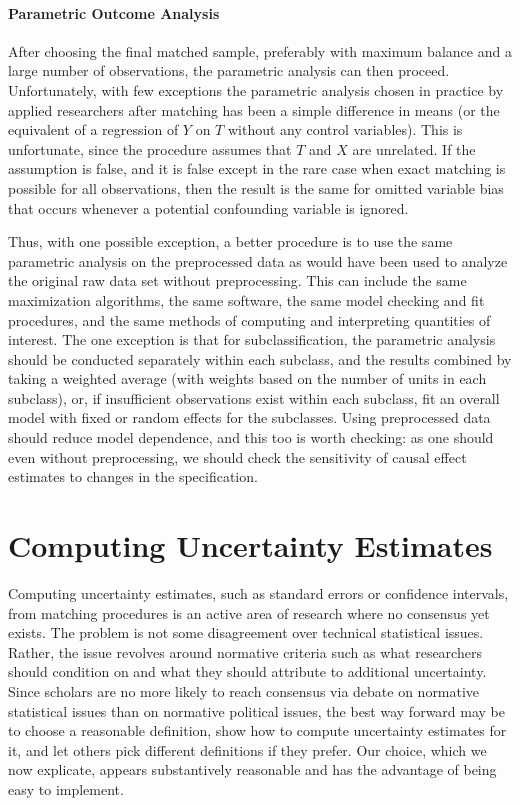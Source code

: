 \documentclass[11pt,titlepage]{article}
\begin{document}
\paragraph{Parametric Outcome Analysis}  
After choosing the final matched sample, preferably with maximum
balance and a large number of observations, the parametric analysis
can then proceed.  Unfortunately, with few exceptions the parametric
analysis chosen in practice by applied researchers after matching has
been a simple difference in means (or the equivalent of a regression
of $Y$ on $T$ without any control variables).  This is unfortunate,
since the procedure assumes that $T$ and $X$ are unrelated.  If the
assumption is false, and it is false except in the rare case when
exact matching is possible for all observations, then the result is
the same for omitted variable bias that occurs whenever a potential
confounding variable is ignored.

Thus, with one possible exception, a better procedure is to use the
same parametric analysis on the preprocessed data as would have been
used to analyze the original raw data set without preprocessing.  This
can include the same maximization algorithms, the same software, the
same model checking and fit procedures, and the same methods of
computing and interpreting quantities of interest.  The one exception
is that for subclassification, the parametric analysis should be
conducted separately within each subclass, and the results combined by
taking a weighted average (with weights based on the number of units
in each subclass), or, if insufficient observations exist within each
subclass, fit an overall model with fixed or random effects for the
subclasses.  Using preprocessed data should reduce model dependence,
and this too is worth checking: as one should even without
preprocessing, we should check the sensitivity of causal effect
estimates to changes in the specification.

\section{Computing Uncertainty Estimates}

Computing uncertainty estimates, such as standard errors or confidence
intervals, from matching procedures is an active area of research
where no consensus yet exists.  The problem is not some disagreement
over technical statistical issues.  Rather, the issue revolves around
normative criteria such as what researchers should condition on and
what they should attribute to additional uncertainty.  Since scholars
are no more likely to reach consensus via debate on normative
statistical issues than on normative political issues, the best way
forward may be to choose a reasonable definition, show how to
compute uncertainty estimates for it, and let others pick different
definitions if they prefer.  Our choice, which we now explicate,
appears substantively reasonable and has the advantage of being easy
to implement.
\end{document}
